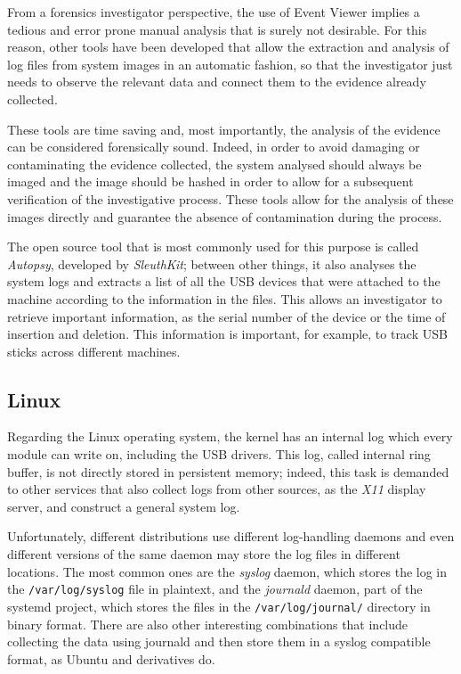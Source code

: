 \documentclass[a4paper]{article}
\begin{document}
From a forensics investigator perspective, the use of Event Viewer implies a
tedious and error prone manual analysis that is surely not desirable. For this
reason, other tools have been developed that allow the extraction and analysis
of log files from system images in an automatic fashion, so that the
investigator just needs to observe the relevant data and connect them to the
evidence already collected.

These tools are time saving and, most importantly, the analysis of the evidence
can be considered forensically sound. Indeed, in order to avoid damaging or
contaminating the evidence collected, the system analysed should always be
imaged and the image should be hashed in order to allow for a subsequent
verification of the investigative process. These tools allow for the analysis of
these images directly and guarantee the absence of contamination during the
process.~\cite{murphey2007automated}

The open source tool that is most commonly used for this purpose is called
\emph{Autopsy}, developed by \emph{SleuthKit}; between other things, it also
analyses the system logs and extracts a list of all the USB devices that were
attached to the machine according to the information in the files. This allows
an investigator to retrieve important information, as the serial number of the
device or the time of insertion and deletion. This information is important, for
example, to track USB sticks across different machines.~\cite{deb2015usb}

\subsection{Linux}
Regarding the Linux operating system, the kernel has an internal log which every
module can write on, including the USB drivers. This log, called internal ring
buffer, is not directly stored in persistent memory; indeed, this task is
demanded to other services that also collect logs from other sources, as the
\emph{X11} display server, and construct a general system log.

Unfortunately, different distributions use different log-handling daemons and
even different versions of the same daemon may store the log files in
different locations. The most common ones are the \emph{syslog} daemon, which
stores the log in the \texttt{/var/log/syslog} file in plaintext, and the
\emph{journald} daemon, part of the systemd project, which stores the files in
the \texttt{/var/log/journal/} directory in binary format. There are also other
interesting combinations that include collecting the data using journald and
then store them in a syslog compatible format, as Ubuntu and derivatives
do.~\cite{poettering2012journal}
\end{document}

